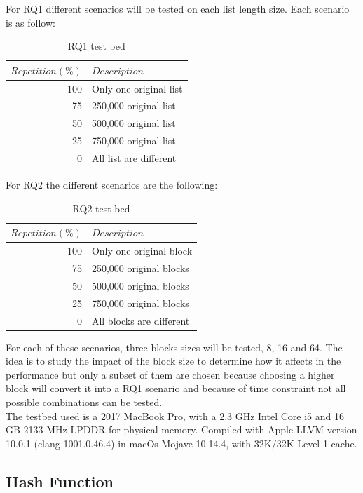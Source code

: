 \documentclass[a4paper,12pt]{article}
\begin{document}
For RQ1 different scenarios will be tested on each list length size. Each scenario is as follow:
\\

\begin{table}[H]
\centering
\begin{tabular}{|r|l|}  \hline
	{$Repetition (\%) $} & {$Description$}  \\  \hline
	100 & Only one original list \\
	75 & 250,000 original list \\
	50 & 500,000 original list \\
	25 & 750,000 original list \\
	0 & All list are different  \\  \hline
\end{tabular}
\caption{RQ1 test bed}
\end{table}

For RQ2 the different scenarios are the following:
\\
\begin{table}[H]
\centering
\begin{tabular}{|r|l|}  \hline
	{$Repetition (\%)$} & {$Description$}  \\  \hline
	100 & Only one  original block \\
	75& 250,000 original blocks   \\
	50& 500,000 original blocks \\
	25& 750,000 original blocks \\
	0 & All blocks are different \\  \hline
\end{tabular}
\caption{RQ2 test bed}
\end{table}

For each of these scenarios, three blocks sizes will be tested,  8, 16 and 64. The idea is to study the impact of the block size to determine how it affects in the performance but only a subset of them are chosen because choosing a higher block will convert it into a RQ1 scenario and because of time constraint not all possible combinations can be tested. \\

The testbed used is a 2017 MacBook Pro, with a 2.3 GHz Intel Core i5 and 16 GB 2133 MHz LPDDR for physical memory. Compiled with Apple LLVM version 10.0.1 (clang-1001.0.46.4) in macOs Mojave 10.14.4, with 32K/32K Level 1 cache.

\subsection{Hash Function}
\end{document}
